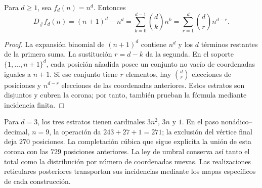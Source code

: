 \begin{proposition}
Para \(d\geq1\), sea \(f_d(n)=n^d\). Entonces
\begin{equation}
 D_\#f_d(n)=(n+1)^d-n^d
 =\sum_{k=0}^{d-1}\binom dk n^k
 =\sum_{r=1}^{d}\binom dr n^{d-r}.
 \label{mg07:binomio}
\end{equation}
\end{proposition}

\begin{proof}
La expansión binomial de \((n+1)^d\) contiene \(n^d\) y los
\(d\) términos restantes de la primera suma. La sustitución
\(r=d-k\) da la segunda. En el soporte
\(\{1,\ldots,n+1\}^d\), cada posición añadida posee un conjunto
no vacío de coordenadas iguales a \(n+1\). Si ese conjunto tiene
\(r\) elementos, hay \(\binom dr\) elecciones de posiciones y
\(n^{d-r}\) elecciones de las coordenadas anteriores. Estos
estratos son disjuntos y cubren la corona; por tanto, también prueban
la fórmula mediante incidencia finita.
\end{proof}

Para \(d=3\), los tres estratos tienen cardinales \(3n^2\),
\(3n\) y \(1\). En el paso nonádico--decimal, \(n=9\), la
operación da \(243+27+1=271\); la exclusión del vértice final deja
\(270\) posiciones. La completación cúbica que sigue explicita la
unión de esta corona con las \(729\) posiciones anteriores. La ley
de umbral conserva así tanto el total como la distribución por número
de coordenadas nuevas. Las realizaciones reticulares posteriores
transportan sus incidencias mediante los mapas específicos de cada
construcción.
